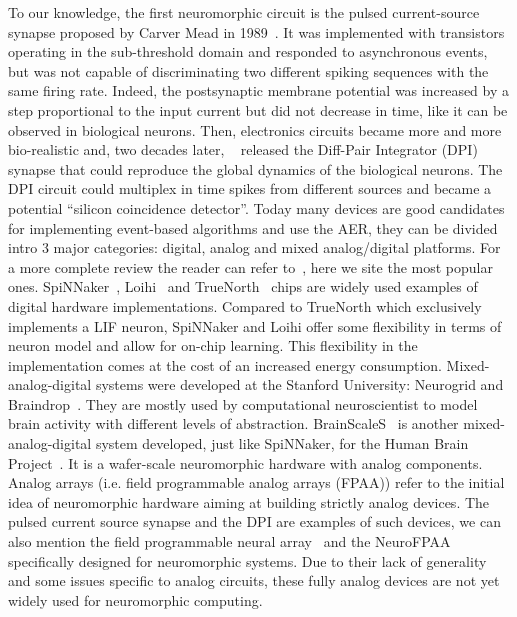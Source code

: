 \documentclass[brainsci, %
               review,submit,pdftex,moreauthors
               ]{Definitions/mdpi}
\begin{document}
To our knowledge, the first neuromorphic circuit is the pulsed current-source synapse proposed by Carver Mead in 1989~\citep{mead_analog_1989}. It was implemented with transistors operating in the sub-threshold domain and responded to asynchronous events, but was not capable of discriminating two different spiking sequences with the same firing rate. Indeed, the postsynaptic membrane potential was increased by a step proportional to the input current but did not decrease in time, like it can be observed in biological neurons. Then, electronics circuits became more and more bio-realistic and, two decades later, ~\citep{bartolozzi_synaptic_2007} released the Diff-Pair Integrator (DPI) synapse that could reproduce the global dynamics of the biological neurons. The DPI circuit could multiplex in time spikes from different sources and became a potential  ``silicon coincidence detector''. Today many devices are good candidates for implementing event-based algorithms and use the AER, they can be divided intro 3 major categories: digital, analog and mixed analog/digital platforms. For a more complete review the reader can refer to~\citep{schuman_survey_2017}, here we site the most popular ones. SpiNNaker~\citep{furber_overview_2013, furber_spinnaker_2020}, Loihi~\citep{davies_loihi_2018} and TrueNorth~\citep{merolla_million_2014} chips are widely used examples of digital hardware implementations. Compared to TrueNorth which exclusively implements a LIF neuron, SpiNNaker and Loihi offer some flexibility in terms of neuron model and allow for on-chip learning. This flexibility in the implementation comes at the cost of an increased energy consumption. Mixed-analog-digital systems were developed at the Stanford University: Neurogrid and Braindrop~\citep{benjamin_neurogrid_2014, neckar_braindrop_2019}. They are mostly used by computational neuroscientist to model brain activity with different levels of abstraction. BrainScaleS~\citep{schemmel_wafer-scale_2010} is another mixed-analog-digital system developed, just like SpiNNaker, for the Human Brain Project~\citep{markram_introducing_2011}. It is a wafer-scale neuromorphic hardware with analog components. Analog arrays (i.e. field programmable analog arrays (FPAA)) refer to the initial idea of neuromorphic hardware aiming at building strictly analog devices. The pulsed current source synapse and the DPI are examples of such devices, we can also mention the field programmable neural array~\citep{farquhar_field_2006} and the NeuroFPAA~\citep{cheng_fpaa_2009} specifically designed for neuromorphic systems. Due to their lack of generality and some issues specific to analog circuits, these fully analog devices are not yet widely used for neuromorphic computing. 
\end{document}
